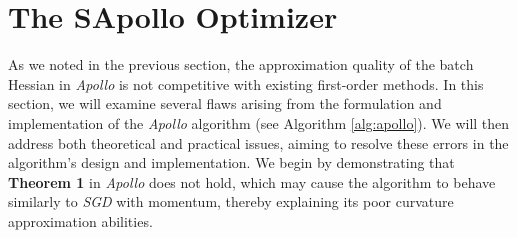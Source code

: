 
\section{The SApollo Optimizer}
As we noted in the previous section, the approximation quality of the batch Hessian in \emph{Apollo} is not competitive with existing first-order methods.
In this section, we will examine several flaws arising from the formulation and implementation of the \emph{Apollo} algorithm (see Algorithm \ref{alg:apollo}).
We will then address both theoretical and practical issues, aiming to resolve these errors in the algorithm's design and implementation.
We begin by demonstrating that \textbf{Theorem 1} in \emph{Apollo} \cite{apollo} does not hold,
which may cause the algorithm to behave similarly to \emph{SGD} with momentum, thereby explaining its poor curvature approximation abilities.\\

